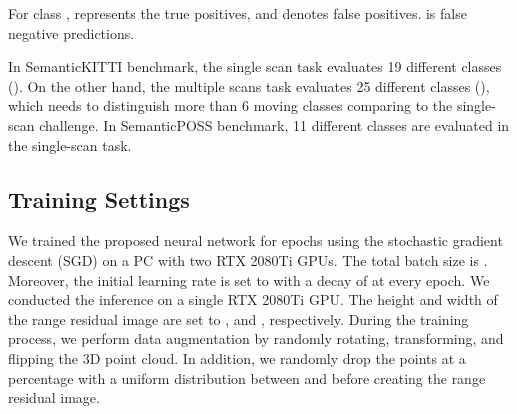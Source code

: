 \documentclass[letterpaper, 10 pt, journal, twoside]{ieeetran}
\begin{document}
For class ,  represents the true positives, and  denotes false positives.  is false negative predictions. 

In SemanticKITTI benchmark, the single scan task evaluates 19 different classes (). On the other hand, the multiple scans task evaluates 25 different classes (), which needs to distinguish more than 6 moving classes comparing to the single-scan challenge. 
In SemanticPOSS benchmark, 11 different classes are evaluated in the single-scan task.



\subsection{Training Settings}
We trained the proposed neural network for  epochs using the stochastic gradient descent (SGD) on a PC with two RTX 2080Ti GPUs. The total batch size is . Moreover, the initial learning rate is set to  with a decay of  at every epoch. We conducted the inference on a single RTX 2080Ti GPU. The height and width of the range residual image are set to , and , respectively. During the training process, we perform data augmentation by randomly rotating, transforming, and flipping the 3D point cloud. In addition, we randomly drop the points at a percentage with a uniform distribution between  and  before creating the range residual image.
\end{document}
